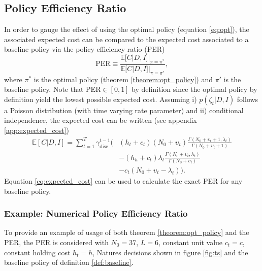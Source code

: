 \subsection{Policy Efficiency Ratio}
In order to gauge the effect of using the optimal policy (equation \eqref{eq:opt}), the associated expected cost can be compared to the expected cost associated to a baseline policy via the policy efficiency ratio (PER)
\begin{equation}
	\text{PER}\equiv \frac{\mathbb{E}[C|D,I]|_{\pi=\pi^*}}{\mathbb{E}[C|D,I]|_{\pi=\pi'}},
	\label{eq:per_def}
\end{equation}
where $\pi^*$ is the optimal policy (theorem \ref{theorem:opt_policy}) and $\pi'$ is the baseline policy. Note that PER$\in [0,1]$ by definition since the optimal policy by definition yield the lowest possible expected cost. Assuming i) $p(\zeta_t|D,I)$ follows a Poisson distribution (with time varying rate parameter) and ii) conditional independence, the expected cost can be written (see appendix \ref{app:expected_cost})
\begin{equation}
	\begin{split}
		\mathbb{E}[C|D,I] = \sum_{t=1}^{T} \gamma_{\text{disc}}^{t-1} \bigg(& 
		(h_t+c_t)(N_0 + \upsilon_t)\frac{\Gamma(N_0+\upsilon_t+1,\lambda_t)}{\Gamma(N_0+\upsilon_t+1)}\\&- (h_h+c_t)\lambda_t \frac{\Gamma(N_0+\upsilon_t,\lambda_t)}{\Gamma(N_0+\upsilon_t)}\\
		&- c_t(N_0 + \upsilon_t-\lambda_t)\bigg).
	\end{split}
	\label{eq:expected_cost}
\end{equation}
Equation \eqref{eq:expected_cost} can be used to calculate the exact PER for any baseline policy.

\subsubsection{Example: Numerical Policy Efficiency Ratio}
To provide an example of usage of both theorem \ref{theorem:opt_policy} and the PER, the PER is considered with $N_0=37$, $L=6$, constant unit value $c_t=c$, constant holding cost $h_t=h$, Natures decisions shown in figure \ref{fig:ts} and the baseline policy of definition \ref{def:baseline}.

